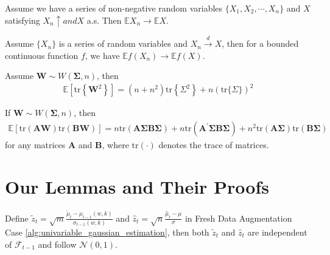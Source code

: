 \begin{lemma}
\label{monotone_convergence}
Assume we have a series of non-negative random variables $\{X_1, X_2,\cdots, X_n\}$ and $X$ satisfying $X_n \uparrow and 
 X$ a.s. Then $ \mathbb{E}X_n \to \mathbb{E} X$.
 \end{lemma}
\begin{lemma}
\label{helly-bray}
Assume $\{X_n\}$ is a series of random variables and $X_n \xrightarrow{d}X$, then for a bounded continuous function $f$, we have $\mathbb{E}f(X_n) \to \mathbb{E}f(X)$.
\end{lemma}

\begin{lemma}
\label{tr(2)_cal_lemma}
Assume $\bm{W} \sim W\left(\bm{\Sigma}, n\right)$, then 
\begin{align}
\mathbb{E}\left[\mathrm{tr}\left\{\bm{W}^2\right\}\right]=\left(n+n^2\right) \mathrm{tr}\left\{\Sigma^2\right\}+n(\mathrm{tr}\{\Sigma\})^2
\end{align}
\end{lemma}
\begin{lemma}
\label{tr^2_cal_lemma}
If $\bm{W} \sim W\left(\bm{\Sigma}, n\right)$, then
\begin{align*}
\mathbb{E}[\mathrm{tr}(\bm A \bm{W}) \mathrm{tr}(\bm B \bm{W})]=n \mathrm{tr}\left(\bm A \bm \Sigma \bm B \bm \Sigma\right)+n \mathrm{tr}(\bm A^{\prime} \bm \Sigma \bm B\bm \Sigma)  +n^2 \mathrm{tr}(\bm{A} \bm \Sigma) \mathrm{tr}(\bm B \bm \Sigma) 
\end{align*}
for any matrices $\bm{A}$ and $\bm{B}$, where $\mathrm{tr}(\cdot)$ denotes the trace of matrices.
\end{lemma}

\section{Our Lemmas and Their Proofs}

\noindent
\begin{lemma}
\label{indepedent_lemma}
Define $ \widetilde{z}_t = \sqrt{m} \frac{\widetilde{\mu}_t - \mu_{t-1}(w,k)}{\sigma_{t-1}(w,k)} $ and $ \widehat{z}_t = \sqrt{n} \frac{\widehat{\mu}_t - \mu}{\sigma} $ in Fresh Data Augmentation Case \ref{alg:univariable_gaussian_estimation}, then both $\widetilde{z}_t$ and $\widehat{z}_t$ are independent of $\mathcal{F}_{t-1}$ and follow $\mathcal{N}(0,1)$.
\end{lemma}

